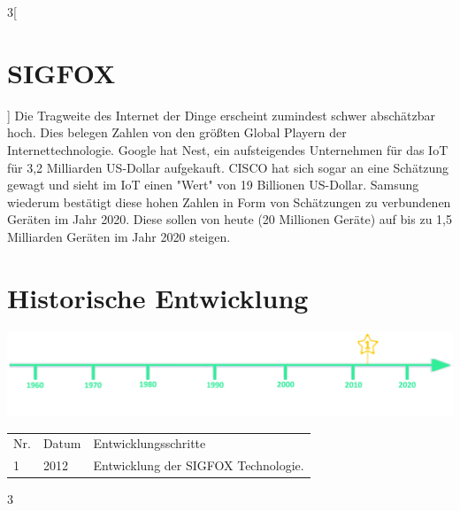 \begin{multicols}{3}[\section{SIGFOX}]
Die Tragweite des Internet der Dinge erscheint zumindest schwer abschätzbar hoch. Dies belegen Zahlen von den größten Global Playern der Internettechnologie. Google hat Nest, ein aufsteigendes Unternehmen für das IoT für 3,2 Milliarden US-Dollar aufgekauft. CISCO hat sich sogar an eine Schätzung gewagt und sieht im IoT einen "Wert" von 19 Billionen US-Dollar. Samsung wiederum bestätigt diese hohen Zahlen in Form von Schätzungen zu verbundenen Geräten im Jahr 2020. Diese sollen von heute (20 Millionen Geräte) auf bis zu 1,5 Milliarden Geräten im Jahr 2020 steigen.~\cite{sigfox.3}


\end{multicols}
\newpage
\section*{Historische Entwicklung}
\includegraphics[width=\textwidth]{Kapitel/SIGFOX/Grafiken/Zeitstrahl}
\par
\noindent
{}
\begin{tabular}{p{0.5 cm}p{1.5 cm}p{15.55 cm}}
	Nr. & Datum & Entwicklungsschritte\\
	1 & 2012 & Entwicklung der SIGFOX Technologie.\\
\end{tabular}
\par
\begin{multicols}{3}

\printbibliography[segment=16,heading=subbibliography]
\end{multicols}


\newpage
